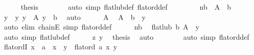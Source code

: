 \begin{isabellebody}
\ \ \ \ \isamarkupfalse%
\ {\isacharquery}{\kern0pt}thesis\isanewline
\ \ \ \ \ \ \isamarkupfalse%
\ {\isacharparenleft}{\kern0pt}auto\ simp{\isacharcolon}{\kern0pt}\ flat{\isacharunderscore}{\kern0pt}lub{\isacharunderscore}{\kern0pt}def\ flat{\isacharunderscore}{\kern0pt}ord{\isacharunderscore}{\kern0pt}def{\isacharparenright}{\kern0pt}\isanewline
\ \ \isamarkupfalse%
\isanewline
\ \ \ \ \isamarkupfalse%
\ nb{\isacharcolon}{\kern0pt}\ {\isachardoublequoteopen}{\isasymnot}\ A\ {\isasymsubseteq}\ {\isacharbraceleft}{\kern0pt}b{\isacharbraceright}{\kern0pt}{\isachardoublequoteclose}\isanewline
\ \ \ \ \isamarkupfalse%
\ \isamarkupfalse%
\ y\ \ y{\isacharcolon}{\kern0pt}\ {\isachardoublequoteopen}y\ {\isasymin}\ A{\isachardoublequoteclose}\ {\isachardoublequoteopen}y\ {\isasymnoteq}\ b{\isachardoublequoteclose}\ \isamarkupfalse%
\ auto\isanewline
\ \ \ \ \isamarkupfalse%
\ A\ \isamarkupfalse%
\ {\isachardoublequoteopen}A\ {\isacharminus}{\kern0pt}\ {\isacharbraceleft}{\kern0pt}b{\isacharbraceright}{\kern0pt}\ {\isacharequal}{\kern0pt}\ {\isacharbraceleft}{\kern0pt}y{\isacharbraceright}{\kern0pt}{\isachardoublequoteclose}\isanewline
\ \ \ \ \ \ \isamarkupfalse%
\ {\isacharparenleft}{\kern0pt}auto\ elim{\isacharcolon}{\kern0pt}\ chainE\ simp{\isacharcolon}{\kern0pt}\ flat{\isacharunderscore}{\kern0pt}ord{\isacharunderscore}{\kern0pt}def{\isacharparenright}{\kern0pt}\isanewline
\ \ \ \ \isamarkupfalse%
\ nb\ \isamarkupfalse%
\ {\isachardoublequoteopen}flat{\isacharunderscore}{\kern0pt}lub\ b\ A\ {\isacharequal}{\kern0pt}\ y{\isachardoublequoteclose}\isanewline
\ \ \ \ \ \ \isamarkupfalse%
\ {\isacharparenleft}{\kern0pt}auto\ simp{\isacharcolon}{\kern0pt}\ flat{\isacharunderscore}{\kern0pt}lub{\isacharunderscore}{\kern0pt}def{\isacharparenright}{\kern0pt}\isanewline
\ \ \ \ \isamarkupfalse%
\ z\ y\ \isamarkupfalse%
\ {\isacharquery}{\kern0pt}thesis\ \isamarkupfalse%
\ auto\ \ \ \ \isanewline
\ \ \isamarkupfalse%
\isanewline
{}\isamarkupfalse%
\ {\isacharparenleft}{\kern0pt}auto\ simp{\isacharcolon}{\kern0pt}\ flat{\isacharunderscore}{\kern0pt}ord{\isacharunderscore}{\kern0pt}def{\isacharparenright}{\kern0pt}%
\endisatagproof
{\isafoldproof}%
%
\isadelimproof
\isanewline
%
\endisadelimproof
\isanewline
{}\isamarkupfalse%
\ flat{\isacharunderscore}{\kern0pt}ordI{\isacharcolon}{\kern0pt}\ {\isachardoublequoteopen}{\isacharparenleft}{\kern0pt}x\ {\isasymnoteq}\ a\ {\isasymLongrightarrow}\ x\ {\isacharequal}{\kern0pt}\ y{\isacharparenright}{\kern0pt}\ {\isasymLongrightarrow}\ flat{\isacharunderscore}{\kern0pt}ord\ a\ x\ y{\isachardoublequoteclose}\isanewline

\end{isabellebody}
